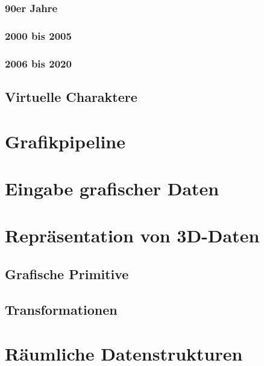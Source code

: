 \documentclass[a4paper, 11pt, accentcolor = tud3b]{tudreport}
\begin{document}
				\subsubsection{90er Jahre} %

				\subsubsection{2000 bis 2005} %

				\subsubsection{2006 bis 2020} %

			\subsection{Virtuelle Charaktere} %

		\section{Grafikpipeline} %

		\section{Eingabe grafischer Daten} %

		\section{Repräsentation von 3D-Daten} %

			\subsection{Grafische Primitive} %

			\subsection{Transformationen} %

		\section{Räumliche Datenstrukturen} %
\end{document}
